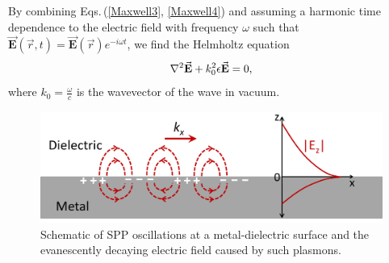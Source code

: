 By combining Eqs.\,(\ref{Maxwell3}, \ref{Maxwell4}) and assuming a harmonic time dependence to the electric field with frequency $\omega$ such that $\vec{\mathbf{E}}(\vec{r},t) = \vec{\mathbf{E}}(\vec{r})e^{-i\omega t}$, we find the Helmholtz equation
\begin{equation}
\centering
\nabla^2\vec{\mathbf{E}} + k_0^2\epsilon \vec{\mathbf{E}} = 0,
\label{Helmholz}
\end{equation}
where $k_0 = \frac{\omega}{c}$ is the wavevector of the wave in vacuum.
\begin{figure}[h!] 
\centering    
\includegraphics[width=\textwidth]{Fig1}
\caption{Schematic of SPP oscillations at a metal-dielectric surface and the evanescently decaying electric field caused by such plasmons.}
\label{3Fig1}
\end{figure}

